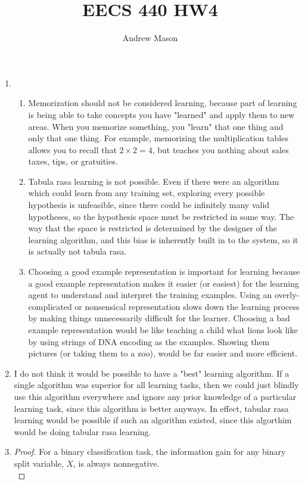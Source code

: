 \documentclass[12pt]{article}
\title{EECS 440 HW4}
\author{Andrew Mason}
\begin{document}
\maketitle

\begin{enumerate}
  \item
    \begin{enumerate}
      \item
        Memorization should not be considered learning, because part of
        learning is being able to take concepts you have "learned" and apply
        them to new areas. When you memorize something, you "learn" that one
        thing and only that one thing. For example, memorizing the
        multiplication tables allows you to recall that $2\times 2=4$, but
        teaches you nothing about sales taxes, tips, or gratuities.
      \item
        Tabula rasa learning is not possible. Even if there were an algorithm
        which could learn from any training set, exploring every possible
        hypothesis is unfeasible, since there could be infinitely many valid
        hypotheses, so the hypothesis space must be restricted in some way. The
        way that the space is restricted is determined by the designer of the
        learning algorithm, and this bias is inherently built in to the system,
        so it is actually not tabula rasa.
      \item
        Choosing a good example representation is important for learning
        because a good example representation makes it easier (or easiest) for
        the learning agent to understand and interpret the training examples.
        Using an overly-complicated or nonsensical representation slows down
        the learning process by making things unnecessarily difficult for the
        learner. Choosing a bad example representation would be like teaching
        a child what lions look like by using strings of DNA encoding as the
        examples. Showing them pictures (or taking them to a zoo), would be far
        easier and more efficient.
    \end{enumerate}
  \item
    I do not think it would be possible to have a "best" learning algorithm. If
    a single algorithm was superior for all learning tasks, then we could just
    blindly use this algorithm everywhere and ignore any prior knowledge of a
    particular learning task, since this algorithm is better anyways. In
    effect, tabular rasa learning would be possible if such an algorithm
    existed, since this algorthim would be doing tabular rasa learning.
  \item
    \begin{proof} For a binary classification task, the information gain for
    any binary split variable, $X$, is always nonnegative.\\


\end{proof}
\end{enumerate}
\end{document}
